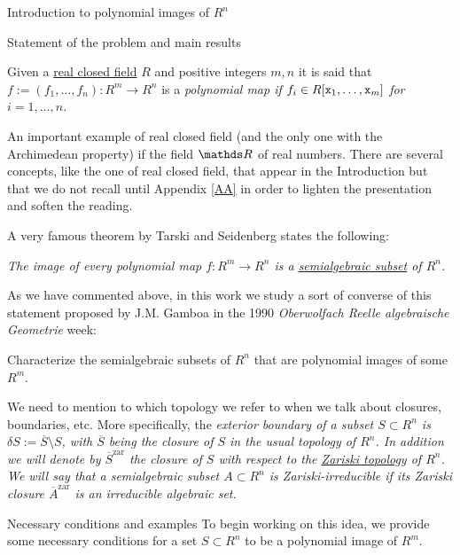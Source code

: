 \documentclass[11pt, a4paper, english, twoside, notitlepage, openright]{report}
\begin{document}
\begin{chapter}{Introduction to polynomial images of $R^n$}
\begin{section}{Statement of the problem and main results}
\begin{definition}\label{polyMap} Given a \hyperref[realCField]{real closed field} $R$ and positive integers $m,n$ it is said that $f:=(f_1,\dots,f_n):R^m\to R^n$ is a \em polynomial map \em if $f_i\in R[{\tt x}_1,\dots,{\tt x}_m]$ for $i=1,\dots,n$. 
\end{definition}

An important example of real closed field (and the only one with the Archimedean property) if the field $\R$ of real numbers. There are several concepts, like the one of real closed field, that appear in the Introduction but that we do not recall until Appendix \ref{AA} in order to lighten the presentation and soften the reading.
	
A very famous theorem by Tarski and Seidenberg states the following:
\begin{theorem}\label{tarskiSeidenberg} \em The image of every polynomial map $f: R^m \longrightarrow R^n$ is a \hyperref[semialgSet]{semialgebraic subset} of $R^n$. \em
\end{theorem}

As we have commented above, in this work we study a sort of converse of this statement proposed by  J.M. Gamboa \cite{g} in the 1990 \emph{Oberwolfach Reelle algebraische Geometrie} week:
\begin{problem}
Characterize the semialgebraic subsets of $R^n$ that are polynomial images of some $R^m$.
\end{problem}
	
We need to mention to which topology we refer to when we talk about closures, boundaries, etc. More specifically, the \em exterior boundary \em of a subset $S\subset R^n$ is $\delta S:=\overline{S}\setminus S$, with $\overline{S}$ being the \em closure \em of $S$ in the usual topology of $R^n$. In addition we will denote by $\overline{S}^{\text{zar}}$ the closure of $S$ with respect to the \hyperref[zariski]{Zariski topology} of $R^n$. We will say that a semialgebraic subset $A\subset R^n$ is \em Zariski-irreducible \em if its Zariski closure $\overline{A}^{\text{zar}}$ is an irreducible algebraic set.
	
\begin{subsection}{Necessary conditions and examples} To begin working on this idea, we provide some necessary conditions for a set $S\subset R^n$ to be a polynomial image of $R^m$. 
	

\end{subsection}
\end{section}
\end{chapter}
\end{document}
